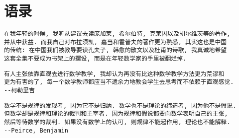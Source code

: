 \chapter{语录}
\begin{verbatim}
在我年轻的时候, 我听从建议去读庞加莱, 希尔伯特, 克莱因以及胡尔维茨等的著作,
并从中获益. 而我自己对布拉须凯, 嘉当和霍普夫的著作更为熟悉, 其实这也是中国
的传统: 在中国我们被教导要读孔夫子, 韩愈的散文以及杜甫的诗歌, 我真诚地希望
这套全集不要成为书架上的摆设, 而是在年轻数学家的手里被翻烂掉.
\end{verbatim}

\begin{verbatim}
有人主张依靠直观去进行数学教学, 我却认为再没有比这种数学教学方法更为荒谬和
更为有害的了, 每一个数学教师都应当不遗余力地教会学生去思考而不依赖于直观感觉.
--柯勒里吉
\end{verbatim}

\begin{verbatim}
数学不是规律的发现者, 因为它不是归纳. 数学也不是理论的缔造者, 因为他不是假说.
但数学却是规律和理论的裁判和主宰者. 因为规律和假说都要向数学表明自己的主张,
然后等待数学的裁判. 如果没有数学上的认可, 则规律不能起作用, 理论也不能解释.
--Peirce, Benjamin
\end{verbatim}

